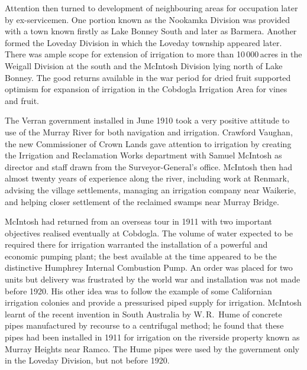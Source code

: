 Attention then turned to development of neighbouring areas for
occupation later by ex-servicemen.  One portion known as the Nookamka
Division was provided with a town known firstly as Lake Bonney South
and later as Barmera.  Another formed the Loveday
Division in which the Loveday township appeared
later.  There was ample scope for extension of irrigation to more than
10\,000\,acres in the Weigall Division at the south and the McIntosh
Division lying north of Lake Bonney.   The good
returns available in the war period for dried fruit
supported optimism for expansion of irrigation in the Cobdogla
Irrigation Area for vines and fruit.

The Verran government installed in June 1910 took a very positive
attitude to use of the Murray River for both navigation and
irrigation.  Crawford Vaughan,   the new
Commissioner of Crown Lands gave attention to irrigation by creating
the Irrigation and Reclamation Works department with Samuel McIntosh
as director and staff drawn from the Surveyor-General's office.
McIntosh  then had almost twenty years of
experience along the river, including work at Renmark, advising the
village settlements, managing an irrigation company near Waikerie,
 and
helping closer settlement of the reclaimed swamps near Murray
Bridge.

McIntosh had returned from an overseas tour in 1911 with two important
objectives realised eventually at Cobdogla.  The
volume of water expected to be required there for irrigation warranted
the installation of a powerful and economic pumping plant; the best
available at the time appeared to be the distinctive Humphrey Internal
Combustion
Pump. %
 An order was placed for two units but
delivery was frustrated by the world war and installation was not made
before 1920.  His other idea was to follow the example of some
Californian irrigation colonies and provide a
pressurised piped supply for irrigation.  McIntosh learnt of the
recent invention in South Australia by W.\,R.~Hume 
of concrete pipes manufactured by
recourse to a centrifugal method; he found that these pipes had been
installed in 1911 for irrigation on the riverside property known as
Murray Heights near Ramco.  The Hume pipes
 were used by the government only in the
Loveday Division, but not before 1920.

